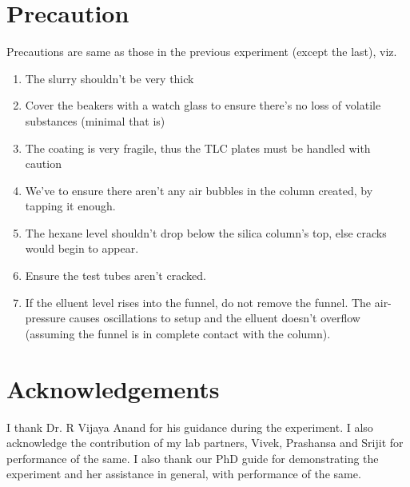 \section{Precaution}
	Precautions are same as those in the previous experiment (except the last), viz.
	\begin{enumerate}
		\item The slurry shouldn't be very thick
		\item Cover the beakers with a watch glass to ensure there's no loss of volatile substances (minimal that is)
		\item The coating is very fragile, thus the TLC plates must be handled with caution
		\item We've to ensure there aren't any air bubbles in the column created, by tapping it enough.
		\item The hexane level shouldn't drop below the silica column's top, else cracks would begin to appear.
		\item Ensure the test tubes aren't cracked.
		\item If the elluent level rises into the funnel, do not remove the funnel. The air-pressure causes oscillations to setup and the elluent doesn't overflow (assuming the funnel is in complete contact with the column).
	\end{enumerate}

	
\section{Acknowledgements}
I thank Dr. R Vijaya Anand for his guidance during the experiment. I also acknowledge the contribution of my lab partners, Vivek, Prashansa and Srijit for performance of the same. I also thank our PhD guide for demonstrating the experiment and her assistance in general, with performance of the same.

